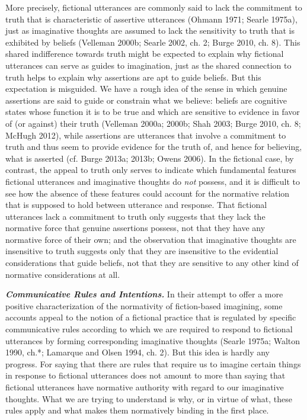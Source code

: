 More precisely, fictional utterances are commonly said to lack the commitment to truth that is characteristic of assertive utterances (Ohmann 1971; Searle 1975a), just as imaginative thoughts are assumed to lack the sensitivity to truth that is exhibited by beliefs (Velleman 2000b; Searle 2002, ch. 2; Burge 2010, ch. 8). This shared indifference towards truth might be expected to explain why fictional utterances can serve as guides to imagination, just as the shared connection to truth helps to explain why assertions are apt to guide beliefs. But this expectation is misguided. We have a rough idea of the sense in which genuine assertions are said to guide or constrain what we believe: beliefs are cognitive states whose function it is to be true and which are sensitive to evidence in favor of (or against) their truth (Velleman 2000a; 2000b; Shah 2003; Burge 2010, ch. 8; McHugh 2012), while assertions are utterances that involve a commitment to truth and thus seem to provide evidence for the truth of, and hence for believing, what is asserted (cf. Burge 2013a; 2013b; Owens 2006). In the fictional case, by contrast, the appeal to truth only serves to indicate which fundamental features fictional utterances and imaginative thoughts do \emph{not} possess, and it is difficult to see how the absence of these features could account for the normative relation that is supposed to hold between utterance and response. That fictional utterances lack a commitment to truth only suggests that they lack the normative force that genuine assertions possess, not that they have any normative force of their own; and the observation that imaginative thoughts are insensitive to truth suggests only that they are insensitive to the evidential considerations that guide beliefs, not that they are sensitive to any other kind of normative considerations at all.

\vspace{.2cm}
\noindent \textbf{\emph{Communicative Rules and Intentions.}} In their attempt to offer a more positive characterization of the normativity of fiction-based imagining, some accounts appeal to the notion of a fictional practice that is regulated by specific communicative rules according to which we are required to respond to fictional utterances by forming corresponding imaginative thoughts (Searle 1975a; Walton 1990, ch.*; Lamarque and Olsen 1994, ch. 2). But this idea is hardly any progress. For saying that there are rules that require us to imagine certain things in response to fictional utterances does not amount to more than saying that fictional utterances have normative authority with regard to our imaginative thoughts. What we are trying to understand is why, or in virtue of what, these rules apply and what makes them normatively binding in the first place.

